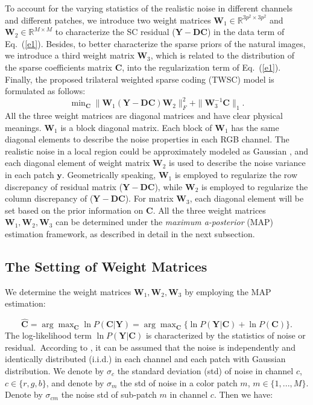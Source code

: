To account for the varying statistics of the realistic noise in different channels and different patches, we introduce two weight matrices $\bm{W}_{1}\in\mathbb{R}^{3p^2\times3p^2}$ and $\bm{W}_{2}\in\mathbb{R}^{M\times M}$ to characterize the SC residual ($\bm{Y}-\bm{D}\bm{C}$) in the data term of Eq.\ (\ref{e1}). Besides, to better characterize the sparse priors of the natural images, we introduce a third weight matrix $\bm{W}_{3}$, which is related to the distribution of the sparse coefficients matrix $\bm{C}$, into the regularization term of Eq.\ (\ref{e1}). Finally, the proposed trilateral weighted sparse coding (TWSC) model is formulated as follows:
\begin{equation}
\label{e3}
\min\nolimits_{\bm{C}}\|\bm{W}_{1}(\bm{Y}-\bm{D}\bm{C})\bm{W}_{2}\|_{F}^{2}
+
\|\bm{W}_{3}^{-1}\bm{C}\|_{1}.
\end{equation}
All the three weight matrices are diagonal matrices and have clear physical meanings. $\bm{W}_{1}$ is a block diagonal matrix. Each block of $\bm{W}_{1}$ has the same diagonal elements to describe the noise properties in each RGB channel. The realistic noise in a local region could be approximately modeled as Gaussian \cite{Leungtip}, and each diagonal element of weight matrix $\bm{W}_{2}$ is used to describe the noise variance in each patch $\bm{y}$. Geometrically speaking, $\bm{W}_{1}$ is employed to regularize the row discrepancy of residual matrix ($\bm{Y}-\bm{D}\bm{C}$), while $\bm{W}_{2}$ is employed to regularize the column discrepancy of ($\bm{Y}-\bm{D}\bm{C}$). For matrix $\bm{W}_{3}$, each diagonal element will be set based on the prior information on $\bm{C}$. All the three weight matrices $\bm{W}_{1},\bm{W}_{2},\bm{W}_{3}$ can be determined under the \textsl{maximum a-posterior} (MAP) estimation framework, as described in detail in the next subsection. 

 
\subsection{The Setting of Weight Matrices}

We determine the weight matrices $\bm{W}_{1},\bm{W}_{2},\bm{W}_{3}$ by employing the MAP estimation:

\begin{equation}
\label{e4}
\hat{\bm{C}} 
=
\arg\max\nolimits_{\bm{C}}\ln P(\bm{C}|\bm{Y})
=
\arg\max\nolimits_{\bm{C}}\{\ln P(\bm{Y}|\bm{C})+\ln P(\bm{C})\}.
\end{equation}
The log-likelihood term $\ln P(\bm{Y}|\bm{C})$ is characterized by the
statistics of noise or residual.\ According to \cite{Leungtip}, it can be assumed that the noise is independently and identically distributed (i.i.d.) in each channel and each patch with Gaussian distribution. We denote by $\sigma_{c}$ the standard deviation (std) of noise in channel $c$, $c\in\{r,g,b\}$, and denote by $\sigma_{m}$ the std of noise in a color patch $m$, $m\in\{1,...,M\}$. Denote by $\sigma_{cm}$ the noise std of sub-patch $m$ in channel $c$. Then we have:

